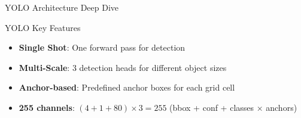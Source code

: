 \documentclass[usenames,dvipsnames]{beamer}
\begin{document}
\begin{frame}{YOLO Architecture Deep Dive}
\begin{center}
		\end{center}
		
		\begin{definitionbox}{YOLO Key Features}
		\begin{itemize}
			\item \textbf{Single Shot}: One forward pass for detection
			\item \textbf{Multi-Scale}: 3 detection heads for different object sizes
			\item \textbf{Anchor-based}: Predefined anchor boxes for each grid cell
			\item \textbf{255 channels}: $(4 + 1 + 80) \times 3 = 255$ (bbox + conf + classes × anchors)
		\end{itemize}
		\end{definitionbox}
	\end{frame}
	
\end{document}
